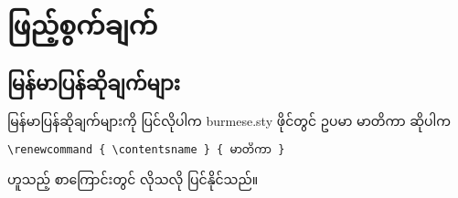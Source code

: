 \chapter{ဖြည့်စွက်ချက်}
\section{မြန်မာပြန်ဆိုချက်များ}

မြန်မာပြန်ဆိုချက်များကို ပြင်လိုပါက burmese.sty ဖိုင်တွင် ဥပမာ မာတိကာ ဆိုပါက
\begin{lstlisting}[style=myTeX,caption={မြန်မာပြန်ဆိုချက်နမူနာ},label={listoflists}]
\renewcommand { \contentsname } { မာတိကာ } 
\end{lstlisting}
ဟူသည့် စာကြောင်းတွင် လိုသလို ပြင်နိုင်သည်။ 


